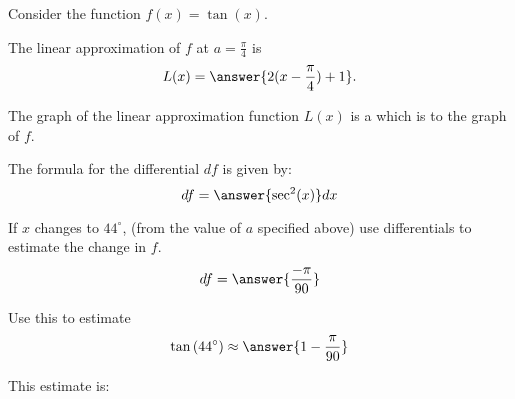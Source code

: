 \documentclass{ximera}
\author{Bobby Ramsey}
\begin{document}
\begin{exercise}

	Consider the function $f(x) = \tan(x)$.

	The linear approximation of $f$ at $a=\frac{\pi}{4}$ is 
	\[ L(x) = \answer{2(x-\frac{\pi}{4})+1}. \]

	The graph of the linear approximation function $L(x)$ is a  which is
		 to the graph of $f$.
	\begin{exercise}
		The formula for the differential $df$ is given by:
		\[ df = \answer{\sec^2(x)} dx \]					
		
		\begin{exercise}
			If $x$ changes to $44^\circ$, (from the value of $a$ specified above) use differentials to estimate the change in $f$.
			\[ df = \answer{\frac{-\pi}{90}} \]
			
			\begin{exercise}
				Use this to estimate \[\tan\left( 44^\circ \right) \approx \answer{1-\frac{\pi}{90}} \]
				
				\begin{exercise}
					This estimate is:
					\begin{multipleChoice}
					\end{multipleChoice}
				\end{exercise}
			\end{exercise}
		\end{exercise}
	\end{exercise}
\end{exercise}
\end{document}
